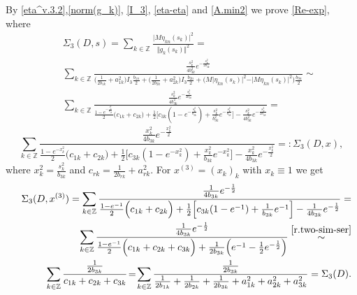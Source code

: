 \documentclass[preprint,12pt]{elsarticle}
\numberwithin{equation}{section}
\begin{document}
\begin{pf}
\begin{equation}
\end{equation}
By \eqref{eta^v.3.2},\eqref{norm(g_k)},  \eqref{I_3}, \eqref{eta-eta} and \eqref{A.min2} we prove \eqref{Re-exp}, where 
\begin{eqnarray}
\nonumber
&&
\Sigma_3(D,s)=\sum_{k\in \mathbb Z}\frac{\vert M\eta_{kn}(s_k)\vert^2}{\Vert g_{k}(s_k)\Vert^2}=\\
\nonumber
&&
\sum_{k\in \mathbb Z}\frac{
\frac{s^2_k}{4b^2_{3k}}
e^{-\frac{s_k^2}{2b_{3k}}}
}
{\Big(\frac{1}{2b_{1k}}+a^2_{1k}\Big)I_3\frac{b_{1n}}{2}+
\Big(\frac{1}{2b_{2k}}+a^2_{2k}\Big)I_3\frac{b_{2n}}{2}+
 \Big(M\vert\eta_{kn}(s_k)\vert^2-\vert M\eta_{kn}(s_k)\vert^2\Big)\frac{b_{3n}}{2}}\sim\\
 \nonumber
 &&
\sum_{k\in \mathbb Z}\frac{
\frac{s^2_k}{4b^2_{3k}}%
e^{-\frac{s_k^2}{2b_{3k}}}
}
{
\frac{1-e^{-\frac{s^2_k}{b_{3k}}}}{2}\Big(c_{1k}+c_{2k}\Big)+
\frac{1}{2}\Big[
c_{3k}(1-e^{-\frac{s^2_k}{b_{3k}}})+
\frac{s^2_k}{b_{3k}^2}e^{-\frac{s^2_k}{b_{3k}}}\Big]-
\frac{s^2_k}{4b_{3k}^2}e^{-\frac{s^2_k}{2b_{3k}}}
 }=
\end{eqnarray} 
\begin{equation}
 \label{D(3,x)}   
\sum_{k\in \mathbb Z}\frac{
\frac{x^2_k}{4b_{3k}}%
e^{-\frac{x_k^2}{2}}
}
{
\frac{1-e^{-x^2_k}
}{2}\Big(c_{1k}+c_{2k}\Big)\!+\!
\frac{1}{2}\Big[
c_{3k}(1\!-\!e^{-x^2_k})+
\frac{x^2_k}{b_{3k}}e^{-x_k^2
}\Big]\!-\!
\frac{x_k^2}{4b_{3k}}e^{-\frac{x^2_k}{2}}
 }=:\Sigma_3(D,x),
\end{equation}
where $x^2_k=\frac{s^2_k}{b_{3k}}$ and $c_{rk}=\frac{1}{2b_{rk}}+a^2_{rk}$. For $x^{(3)}=(x_k)_k$
with $x_k\equiv 1$ we get
\begin{eqnarray}
\nonumber
&&
\Sigma_3(D,x^{(3)})=
\sum_{k\in \mathbb Z}\frac{
\frac{1}{4b_{3k}}%
e^{-\frac{1}{2}}
}
{
\frac{1-e^{-1}
}{2}\Big(c_{1k}+c_{2k}\Big)+
\frac{1}{2}\Big[
c_{3k}(1-e^{-1})+
\frac{1}{b_{3k}}e^{-1
}\Big]-
\frac{1}{4b_{3k}}e^{-\frac{1}{2}}}=\\
\nonumber
&&
\sum_{k\in \mathbb Z}\frac{
\frac{1}{4b_{3k}}%
e^{-\frac{1}{2}}
}
{
\frac{1-e^{-1}
}{2}\Big(c_{1k}+c_{2k}+c_{3k}\Big)+
\frac{1}{2b_{3k}}\Big(e^{-1}-\frac{1}{2}e^{-\frac{1}{2}}\Big)}\stackrel{\eqref{r.two-sim-ser}}{\sim}\\
\label{D_3}
&&
\sum_{k\in \mathbb Z}\frac{\frac{1}{2b_{3k}}}
{c_{1k}+c_{2k}+c_{3k}}\!=\!
\sum_{k\in \mathbb Z}\frac{\frac{1}{2b_{3k}}}
{\frac{1}{2b_{1k}}+\frac{1}{2b_{2k}}+\frac{1}{2b_{3k}}+
a^2_{1k}+a^2_{2k}+a^2_{3k}}=\Sigma_3(D).
\end{eqnarray}

\end{pf}
\end{document}
